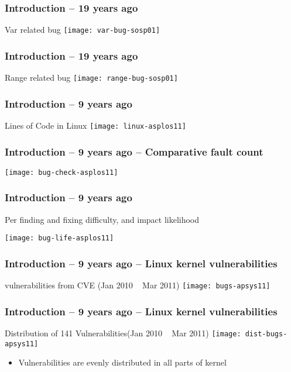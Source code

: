 \begin{frame}[plain]
	\frametitle{Introduction -- 19 years ago}
	\centering
	Var related bug
	\texttt{[image: var-bug-sosp01]}
	
\end{frame}

\begin{frame}[plain]
	\frametitle{Introduction -- 19 years ago}
	\centering
	Range related bug
	\texttt{[image: range-bug-sosp01]}
	
\end{frame}

\begin{frame}[plain]
	\frametitle{Introduction -- 9 years ago}
	\centering
	Lines of Code in Linux
	\texttt{[image: linux-asplos11]}
	
\end{frame}


\begin{frame}[plain]
	\frametitle{Introduction -- 9 years ago -- Comparative fault count}
	\centering
	
	\texttt{[image: bug-check-asplos11]}
	
\end{frame}

\begin{frame}[plain]
	\frametitle{Introduction -- 9 years ago }
	\centering
	Per finding and fixing difficulty, and impact likelihood
	
	\texttt{[image: bug-life-asplos11]}
	
\end{frame}
\begin{frame}[plain]
	\frametitle{Introduction -- 9 years ago -- Linux kernel vulnerabilities}
	 vulnerabilities from CVE (Jan 2010 ~ Mar 2011)
	\texttt{[image: bugs-apsys11]}
	
\end{frame}


\begin{frame}[plain]
	\frametitle{Introduction -- 9 years ago -- Linux kernel vulnerabilities}
	\centering
	Distribution of 141 Vulnerabilities(Jan 2010 ~ Mar 2011)
	\texttt{[image: dist-bugs-apsys11]}
	\begin{itemize}
		\item Vulnerabilities are evenly distributed in all parts of kernel
	
	\end{itemize}
\end{frame}

